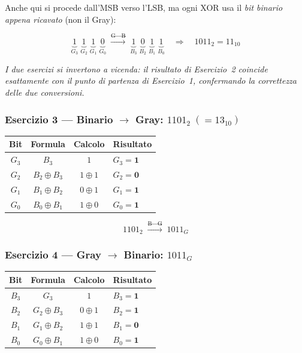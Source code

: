 \medskip
\noindent Anche qui si procede dall'MSB verso l'LSB, ma ogni XOR usa il \emph{bit binario appena ricavato} (non il Gray):

\[
\underbrace{1}_{G_3}\;\underbrace{1}_{G_2}\;\underbrace{1}_{G_1}\;\underbrace{0}_{G_0}
\;\xrightarrow{\text{G}\to\text{B}}\;
\underbrace{1}_{B_3}\;\underbrace{0}_{B_2}\;\underbrace{1}_{B_1}\;\underbrace{1}_{B_0}
\quad\Rightarrow\quad \boxed{1011_2 = 11_{10}}
\]

\vspace{0.5em}
\noindent\textit{I due esercizi si invertono a vicenda: il risultato di Esercizio~2 coincide esattamente con il punto di partenza di Esercizio~1, confermando la correttezza delle due conversioni.}

\vspace{1.5em}

\subsubsection*{Esercizio 3 — Binario $\to$ Gray: \quad $1101_2 \;(=13_{10})$}

\medskip
\begin{center}
\begin{tabular}{c|c|c|l}
\toprule
Bit & Formula & Calcolo & Risultato\\
\midrule
$G_3$ & $B_3$ & $1$ & $G_3 = \mathbf{1}$ \\
$G_2$ & $B_2 \oplus B_3$ & $1 \oplus 1$ & $G_2 = \mathbf{0}$ \\
$G_1$ & $B_1 \oplus B_2$ & $0 \oplus 1$ & $G_1 = \mathbf{1}$ \\
$G_0$ & $B_0 \oplus B_1$ & $1 \oplus 0$ & $G_0 = \mathbf{1}$ \\
\bottomrule
\end{tabular}
\end{center}

\[
1101_2 \;\xrightarrow{\text{B}\to\text{G}}\; \boxed{1011_G}
\]

\subsubsection*{Esercizio 4 — Gray $\to$ Binario: \quad $1011_G$}

\medskip
\begin{center}
\begin{tabular}{c|c|c|l}
\toprule
Bit & Formula & Calcolo & Risultato\\
\midrule
$B_3$ & $G_3$ & $1$ & $B_3 = \mathbf{1}$ \\
$B_2$ & $G_2 \oplus B_3$ & $0 \oplus 1$ & $B_2 = \mathbf{1}$ \\
$B_1$ & $G_1 \oplus B_2$ & $1 \oplus 1$ & $B_1 = \mathbf{0}$ \\
$B_0$ & $G_0 \oplus B_1$ & $1 \oplus 0$ & $B_0 = \mathbf{1}$ \\
\bottomrule
\end{tabular}
\end{center}

